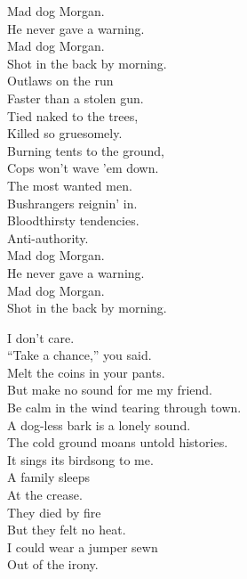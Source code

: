 Mad dog Morgan. \\
He never gave a warning. \\
Mad dog Morgan. \\
Shot in the back by morning. \\

Outlaws on the run \\
Faster than a stolen gun. \\
Tied naked to the trees, \\
Killed so gruesomely. \\

Burning tents to the ground, \\
Cops won't wave 'em down. \\
The most wanted men. \\
Bushrangers reignin' in. \\

Bloodthirsty tendencies. \\
Anti-authority. \\

Mad dog Morgan. \\
He never gave a warning. \\
Mad dog Morgan. \\
Shot in the back by morning. \\





I don't care. \\
``Take a chance,'' you said. \\
Melt the coins in your pants. \\
But make no sound for me my friend. \\

Be calm in the wind tearing through town. \\
A dog-less bark is a lonely sound. \\

The cold ground moans untold histories. \\
It sings its birdsong to me. \\

A family sleeps \\
At the crease. \\
They died by fire \\
But they felt no heat. \\
I could wear a jumper sewn \\
Out of the irony. \\

